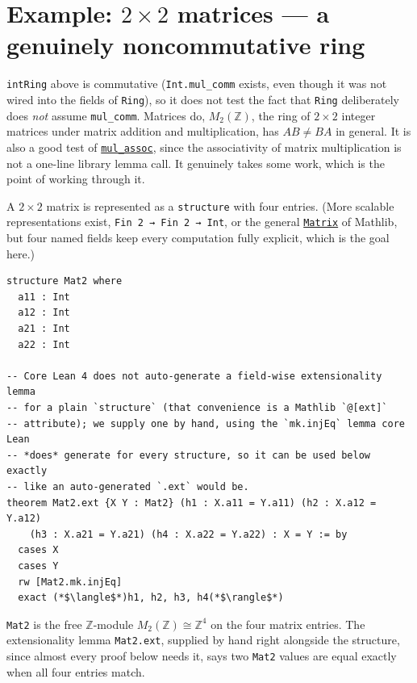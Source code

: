 \section{\texorpdfstring{Example: \(2\times 2\) matrices --- a genuinely noncommutative ring}{Example: 2\textbackslash times 2 matrices --- a genuinely noncommutative ring}}\label{sec:09-rings:07-matrices:1}

\texttt{intRing} above is commutative (\texttt{Int.mul\_\allowbreak{}comm} exists, even though it was not wired into the fields of \texttt{Ring}), so it does not test the fact that \texttt{Ring} deliberately does \emph{not} assume \texttt{mul\_\allowbreak{}comm}. Matrices do, \(M_2(\mathbb{Z})\), the ring of \(2\times 2\) integer matrices under matrix addition and multiplication, has \(AB \neq BA\) in general. It is also a good test of \href{https://loogle.lean-lang.org/?q=mul_assoc}{\texttt{mul\_\allowbreak{}assoc}}, since the associativity of matrix multiplication is not a one-line library lemma call. It genuinely takes some work, which is the point of working through it.

A \(2 \times 2\) matrix is represented as a \texttt{structure} with four entries. (More scalable representations exist, \texttt{Fin 2 → Fin 2 → Int}, or the general \href{https://loogle.lean-lang.org/?q=Matrix}{\texttt{Matrix}} of Mathlib, but four named fields keep every computation fully explicit, which is the goal here.)

\begin{lstlisting}
structure Mat2 where
  a11 : Int
  a12 : Int
  a21 : Int
  a22 : Int

-- Core Lean 4 does not auto-generate a field-wise extensionality lemma
-- for a plain `structure` (that convenience is a Mathlib `@[ext]`
-- attribute); we supply one by hand, using the `mk.injEq` lemma core Lean
-- *does* generate for every structure, so it can be used below exactly
-- like an auto-generated `.ext` would be.
theorem Mat2.ext {X Y : Mat2} (h1 : X.a11 = Y.a11) (h2 : X.a12 = Y.a12)
    (h3 : X.a21 = Y.a21) (h4 : X.a22 = Y.a22) : X = Y := by
  cases X
  cases Y
  rw [Mat2.mk.injEq]
  exact (*$\langle$*)h1, h2, h3, h4(*$\rangle$*)
\end{lstlisting}

\begin{mathreading}

\texttt{Mat2} is the free \(\mathbb{Z}\)-module \(M_2(\mathbb{Z}) \cong \mathbb{Z}^4\) on the four matrix entries. The extensionality lemma \texttt{Mat2.ext}, supplied by hand right alongside the structure, since almost every proof below needs it, says two \texttt{Mat2} values are equal exactly when all four entries match.

\end{mathreading}

